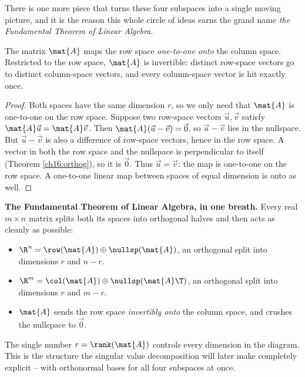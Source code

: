 There is one more piece that turns these four subspaces into a single moving
picture, and it is the reason this whole circle of ideas earns the grand name
\emph{the Fundamental Theorem of Linear Algebra}.

\begin{theorem}\label{ch16:rowspace-iso}
The matrix $\mat{A}$ maps the row space \emph{one-to-one onto} the column space.
Restricted to the row space, $\mat{A}$ is invertible: distinct row-space vectors
go to distinct column-space vectors, and every column-space vector is hit exactly
once.
\end{theorem}

\begin{proof}
Both spaces have the same dimension $r$, so we only need that $\mat{A}$ is
one-to-one on the row space. Suppose two row-space vectors $\vec{u},\vec{v}$
satisfy $\mat{A}\vec{u}=\mat{A}\vec{v}$. Then $\mat{A}(\vec{u}-\vec{v})=\vec0$, so
$\vec{u}-\vec{v}$ lies in the nullspace. But $\vec{u}-\vec{v}$ is also a
difference of row-space vectors, hence in the row space. A vector in both the row
space and the nullspace is perpendicular to itself (Theorem
\ref{ch16:orthog}), so it is $\vec0$. Thus $\vec{u}=\vec{v}$: the map is
one-to-one on the row space. A one-to-one linear map between spaces of equal
dimension is onto as well.
\end{proof}

\begin{focusbox}
\textbf{The Fundamental Theorem of Linear Algebra, in one breath.} Every real
$m\times n$ matrix splits both its spaces into orthogonal halves and then acts as
cleanly as possible:
\begin{itemize}
  \item $\R^n = \row(\mat{A}) \oplus \nullsp(\mat{A})$, an orthogonal split into
        dimensions $r$ and $n-r$.
  \item $\R^m = \col(\mat{A}) \oplus \nullsp(\mat{A}\T)$, an orthogonal split into
        dimensions $r$ and $m-r$.
  \item $\mat{A}$ sends the row space \emph{invertibly onto} the column space, and
        crushes the nullspace to $\vec0$.
\end{itemize}
The single number $r=\rank(\mat{A})$ controls every dimension in the diagram. This
is the structure the singular value decomposition will later make completely
explicit -- with orthonormal bases for all four subspaces at once.
\end{focusbox}

